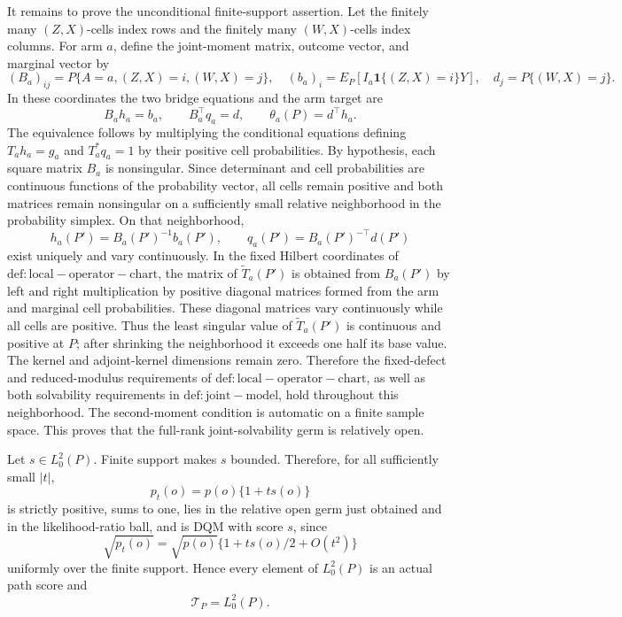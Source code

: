 It remains to prove the unconditional finite-support assertion.  Let the finitely many \((Z,X)\)-cells index rows and the finitely many \((W,X)\)-cells index columns.  For arm \(a\), define the joint-moment matrix, outcome vector, and marginal vector by
\[
 (B_a)_{ij}=P\{A=a,(Z,X)=i,(W,X)=j\},\quad
 (b_a)_i=E_P[I_a\mathbf 1\{(Z,X)=i\}Y],\quad
 d_j=P\{(W,X)=j\}.                                                  \tag{17}
\]
In these coordinates the two bridge equations and the arm target are
\[
 B_ah_a=b_a,
 \qquad B_a^\top q_a=d,
 \qquad \theta_a(P)=d^\top h_a.                                   \tag{18}
\]
The equivalence follows by multiplying the conditional equations defining \(T_a h_a=g_a\) and \(T_a^*q_a=1\) by their positive cell probabilities.  By hypothesis, each square matrix \(B_a\) is nonsingular.  Since determinant and cell probabilities are continuous functions of the probability vector, all cells remain positive and both matrices remain nonsingular on a sufficiently small relative neighborhood in the probability simplex.  On that neighborhood,
\[
 h_a(P')=B_a(P')^{-1}b_a(P'),
 \qquad q_a(P')=B_a(P')^{-\top}d(P')                               \tag{19}
\]
exist uniquely and vary continuously.  In the fixed Hilbert coordinates of \(\mathrm{def:local-operator-chart}\), the matrix of \(\widetilde T_a(P')\) is obtained from \(B_a(P')\) by left and right multiplication by positive diagonal matrices formed from the arm and marginal cell probabilities.  These diagonal matrices vary continuously while all cells are positive.  Thus the least singular value of \(\widetilde T_a(P')\) is continuous and positive at \(P\); after shrinking the neighborhood it exceeds one half its base value.  The kernel and adjoint-kernel dimensions remain zero.  Therefore the fixed-defect and reduced-modulus requirements of \(\mathrm{def:local-operator-chart}\), as well as both solvability requirements in \(\mathrm{def:joint-model}\), hold throughout this neighborhood.  The second-moment condition is automatic on a finite sample space.  This proves that the full-rank joint-solvability germ is relatively open.

Let \(s\in L_0^2(P)\).  Finite support makes \(s\) bounded.  Therefore, for all sufficiently small \(|t|\),
\[
 p_t(o)=p(o)\{1+ts(o)\}                                            \tag{20}
\]
is strictly positive, sums to one, lies in the relative open germ just obtained and in the likelihood-ratio ball, and is DQM with score \(s\), since
\[
 \sqrt{p_t(o)}=\sqrt{p(o)}\{1+ts(o)/2+O(t^2)\}
\]
uniformly over the finite support.  Hence every element of \(L_0^2(P)\) is an actual path score and
\[
 \mathcal T_P=L_0^2(P).                                             \tag{21}
\]

